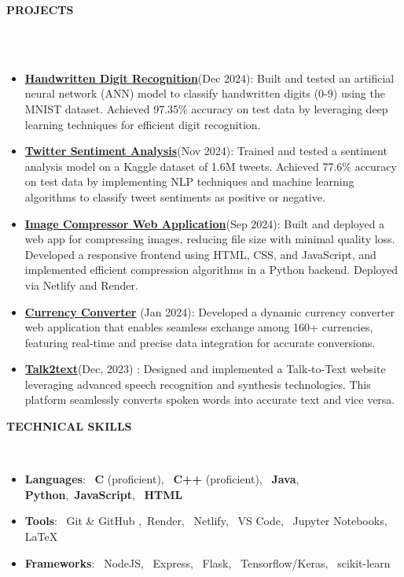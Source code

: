 \documentclass[a4paper,10pt]{article}
\newcommand{\lsep}{-0.5cm}
\newcommand{\resheading}[1]{{\small \colorbox{mygrey}{\begin{minipage}{0.975\textwidth}{\textbf{#1 \vphantom{p\^{E}}}}\end{minipage}}}}
\begin{document}
\resheading{\textbf{PROJECTS} }\\[\lsep]
\\
\begin{itemize}
\setlength\itemsep{0.5em}
\item \textbf{\href{https://github.com/VinodPandey14/Handwritten-Digit-Recognition-using-ANN}{Handwritten Digit Recognition}}(Dec 2024):  Built and tested an artificial neural network (ANN) model to classify handwritten digits (0-9) using the MNIST dataset. Achieved 97.35\% accuracy on test data by leveraging deep learning techniques for efficient digit recognition.

\item \textbf{\href{https://github.com/VinodPandey14/Twitter-Sentiment-Analysis}{Twitter Sentiment Analysis}}(Nov 2024):  Trained and tested a sentiment analysis model on a Kaggle dataset of 1.6M tweets. Achieved 77.6\% accuracy on test data by implementing NLP techniques and machine learning algorithms to classify tweet sentiments as positive or negative.

\item \textbf{\href{https://compress-img.netlify.app/}{Image Compressor Web Application}}(Sep 2024): Built and deployed a web app for compressing images, reducing file size with minimal quality loss. Developed a responsive frontend using HTML, CSS, and JavaScript, and implemented efficient compression algorithms in a Python backend. Deployed via Netlify and Render.

\item \textbf{\href{https://currency-converter-vp.netlify.app/}{Currency Converter}} (Jan 2024): Developed a dynamic currency converter web application that enables seamless exchange among 160+ currencies, featuring real-time and precise data integration for accurate conversions.

\item \textbf{\href{https://talk2text.netlify.app/}{Talk2text}}(Dec, 2023) : Designed and implemented a Talk-to-Text website leveraging advanced speech recognition and synthesis technologies. This platform seamlessly converts spoken words into accurate text and vice versa.

\end{itemize}

\resheading{\textbf{TECHNICAL SKILLS} }\\[\lsep]
\begin{itemize}
\setlength\itemsep{0em}
\item \noindent \textbf{Languages}: \  \textbf{C} (proficient), \  \textbf{C++} (proficient), \ \textbf{Java}, \textbf{Python},\ \textbf{JavaScript}, \   \textbf{HTML}\\
 \item \noindent\textbf{Tools}:  \ Git \& GitHub ,\ Render, \ Netlify, \ VS Code, \ Jupyter Notebooks, \LaTeX\\

\item \noindent\textbf{Frameworks}: \ NodeJS, \ Express, \ Flask,  \ Tensorflow/Keras, \ scikit-learn
\end{itemize}
\end{document}
